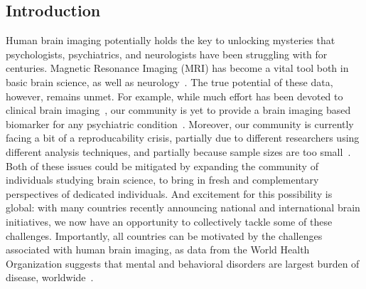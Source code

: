 \documentclass[11pt]{article}
\begin{document}
\begin{multicols}{2}





\section{Introduction}

Human brain imaging potentially holds the key to unlocking mysteries that psychologists, psychiatrics, and neurologists have been struggling with for centuries.  Magnetic Resonance Imaging (MRI) has become a vital tool both in basic brain science, as well as neurology~\cite{}.  The true potential of these data, however, remains unmet.  For example, while much effort has been devoted to clinical brain imaging~\cite{}, our community is yet to provide a brain imaging based biomarker for any psychiatric condition~\cite{}.  Moreover, our community is currently facing a bit of a reproducability crisis, partially due to different researchers using different analysis techniques, and partially because sample sizes are too small~\cite{}.  Both of these issues could be mitigated by expanding the community of individuals studying brain science, to bring in fresh and complementary perspectives of dedicated individuals.  And excitement for this possibility is global: with many countries recently announcing national and international brain initiatives, we now have an opportunity to collectively tackle some of these challenges.  Importantly, all countries can be motivated by the challenges associated with human brain imaging, as data from the World Health Organization suggests that mental and behavioral disorders are largest burden of disease, worldwide~\cite{Whiteford13, Vigo16}.



\end{multicols}
\end{document}
